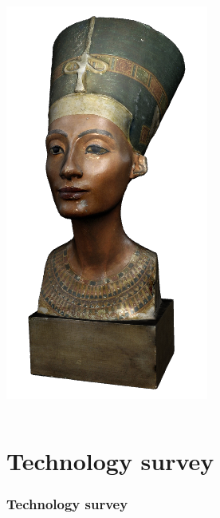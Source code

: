 \begin{frame}
\begin{columns}
\begin{column}{0.2\textwidth}
      \includegraphics[width=.9\textwidth]{images/nefertiti}
    \end{column}
  \end{columns}
\end{frame}

\section{Technology survey}

\begin{frame}
  \frametitle{Technology survey}
\end{frame}


